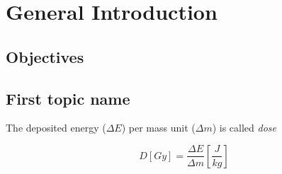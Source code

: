 \chapter{General Introduction} \label{introduction}
\setcounter{page}{1}

\section{Objectives}

\section{First topic name}

The deposited energy ($\Delta E$) per mass unit ($\Delta m$) is called \textit{dose}

\begin{equation}
D[Gy]=\frac{\Delta E}{\Delta m} \left [ \frac{J}{kg} \right]
\end{equation}